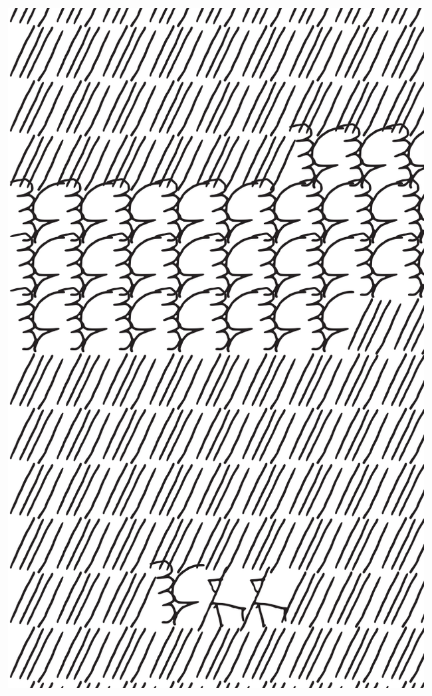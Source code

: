 \makeatletter\@openrightfalse
\movetooddpage
\begin{absolutelynopagebreak}
\begin{vplace}
\begin{figure}[H]
\begin{adjustwidth}{-0.99cm}{}
  \centering
  \vspace*{-1.77cm}
  \hspace*{-0.45cm}
  \includegraphics[width=110mm]{./imgs/img6.pdf}  
  \hfill
\end{adjustwidth}

\thispagestyle{empty}

\end{figure}
\end{vplace}

\end{absolutelynopagebreak}

